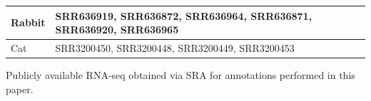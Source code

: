 \documentclass[fleqn,10pt]{wlscirep}
\begin{document}
\begin{center}
\begin{longtable}{|p{}|p{}|p{}|}
Rabbit    & SRR636919, SRR636872, SRR636964, SRR636871, SRR636920, SRR636965                                                                                                                                                                                                                                                                                                                                                                               &                                                                                                                       \\ \hline
Cat       & SRR3200450, SRR3200448, SRR3200449, SRR3200453                                                                                                                                                                                                                                                                                                                                                                                                 &                                                             \\ \hline                           
\end{longtable}
Publicly available RNA-seq obtained via SRA for annotations performed in this paper. 
\end{center}
\end{document}
